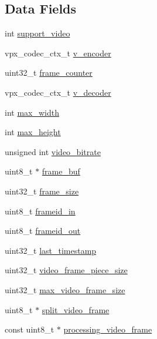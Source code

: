 \subsection*{Data Fields}
\begin{DoxyCompactItemize}
\item 
int \hyperlink{struct___c_s_session_a269c7451109b710b39367a8ef63afce9}{support\+\_\+video}
\item 
vpx\+\_\+codec\+\_\+ctx\+\_\+t \hyperlink{struct___c_s_session_a0ec480a7314c0f185ae18f411d73b1bd}{v\+\_\+encoder}
\item 
uint32\+\_\+t \hyperlink{struct___c_s_session_abeaee952422869c026bab7d7f3f0f145}{frame\+\_\+counter}
\item 
vpx\+\_\+codec\+\_\+ctx\+\_\+t \hyperlink{struct___c_s_session_aa155f92243013193ef3fd9fd1b919bd0}{v\+\_\+decoder}
\item 
int \hyperlink{struct___c_s_session_aa224a991c08c1d696a040a415d6a4a92}{max\+\_\+width}
\item 
int \hyperlink{struct___c_s_session_a3826471ddaa71d2730a6930625867bc1}{max\+\_\+height}
\item 
unsigned int \hyperlink{struct___c_s_session_acafa0ba061c3e09d3f17852abf830968}{video\+\_\+bitrate}
\item 
uint8\+\_\+t $\ast$ \hyperlink{struct___c_s_session_aa4046ccf60d85f4f486ae0b24e3347f5}{frame\+\_\+buf}
\item 
uint32\+\_\+t \hyperlink{struct___c_s_session_a0229abcfe4414f86dcf52c5ebf84311c}{frame\+\_\+size}
\item 
uint8\+\_\+t \hyperlink{struct___c_s_session_affc5ab5608c4d2dea8513fdc2b2cd6e6}{frameid\+\_\+in}
\item 
uint8\+\_\+t \hyperlink{struct___c_s_session_acea7b9bf7e58ed8e24980edeaacecc25}{frameid\+\_\+out}
\item 
uint32\+\_\+t \hyperlink{struct___c_s_session_ab3eadf01045769905278f1908af23558}{last\+\_\+timestamp}
\item 
uint32\+\_\+t \hyperlink{struct___c_s_session_af3563a0a96eb120a68e82d3135b6c49b}{video\+\_\+frame\+\_\+piece\+\_\+size}
\item 
uint32\+\_\+t \hyperlink{struct___c_s_session_a4de5a61c775468baabb35e2fcfaaa3a2}{max\+\_\+video\+\_\+frame\+\_\+size}
\item 
uint8\+\_\+t $\ast$ \hyperlink{struct___c_s_session_a100e5e445d6e9ff7775a1020dc780e56}{split\+\_\+video\+\_\+frame}
\item 
const uint8\+\_\+t $\ast$ \hyperlink{struct___c_s_session_ae94ea43be63edb42efe44edae585064e}{processing\+\_\+video\+\_\+frame}

\end{DoxyCompactItemize}
